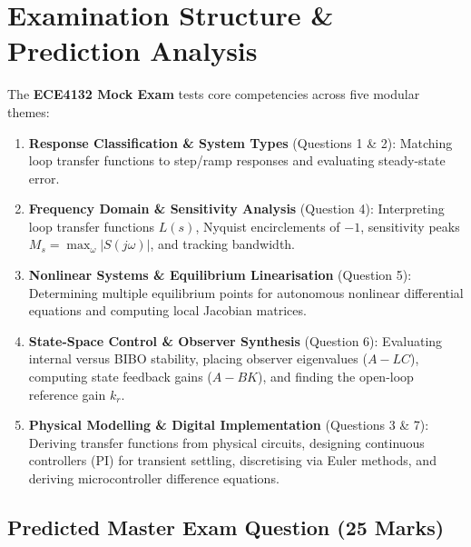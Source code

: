 \documentclass[12pt,onecolumn,twoside ]{article}
\begin{document}
	\newpage
	\section{Examination Structure \& Prediction Analysis}
	The \textbf{ECE4132 Mock Exam} tests core competencies across five modular themes:
	\begin{enumerate}
		\item
		\textbf{Response Classification \& System Types} (Questions 1 \& 2): Matching loop transfer functions to step/ramp responses and evaluating steady-state error.
		\item
		\textbf{Frequency Domain \& Sensitivity Analysis} (Question 4): Interpreting loop transfer functions $L(s)$, Nyquist encirclements of $-1$, sensitivity peaks $M_s = \max_\omega |S(j\omega)|$, and tracking bandwidth.
		\item
		\textbf{Nonlinear Systems \& Equilibrium Linearisation} (Question 5): Determining multiple equilibrium points for autonomous nonlinear differential equations and computing local Jacobian matrices.
		\item
		\textbf{State-Space Control \& Observer Synthesis} (Question 6): Evaluating internal versus BIBO stability, placing observer eigenvalues ($A - LC$), computing state feedback gains ($A - BK$), and finding the open-loop reference gain $k_r$.
		\item
		\textbf{Physical Modelling \& Digital Implementation} (Questions 3 \& 7): Deriving transfer functions from physical circuits, designing continuous controllers (PI) for transient settling, discretising via Euler methods, and deriving microcontroller difference equations.
	\end{enumerate}
	
	\subsection{Predicted Master Exam Question (25 Marks)}
\end{document}
